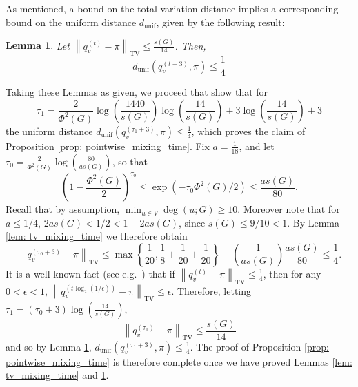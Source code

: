 \documentclass[11pt,twoside]{article}
\newtheorem{lemma}{Lemma}
\newcommand{\set}[1]{\left\{#1\right\}}
\newcommand{\norm}[1]{\left\lVert#1\right\rVert}
\newcommand{\1}{\mathbf{1}}
\begin{document}
As mentioned, a bound on the total variation distance implies a corresponding bound on the uniform distance $d_{\mathrm{unif}}$, given by the following result:
\begin{lemma}
	\label{lem: tv_to_uniform_distance}
	Let $\norm{q_v^{(t)} - \pi}_{\mathrm{TV}} \leq \frac{s(G)}{14}$. Then,
	\begin{equation*}
	d_{\mathrm{unif}}(q_v^{(t + 3)},\pi) \leq \frac{1}{4}
	\end{equation*}
\end{lemma}

\noindent Taking these Lemmas as given, we proceed that show that for
\begin{equation*}
\tau_1 = \frac{2}{\Phi^2(G)} \log \left(\frac{1440}{s(G)}\right)\log \left(\frac{14}{s(G)}\right)  + 3 \log \left(\frac{14}{s(G)}\right) + 3
\end{equation*}
the uniform distance $d_{\textrm{unif}}(q_v^{(\tau_1 + 3)}, \pi) \leq \frac{1}{4}$, which proves the claim of Proposition \ref{prop: pointwise_mixing_time}. Fix $a = \frac{1}{18}$, and let $\tau_0 = \frac{2}{\Phi^2(G)} \log \left(\frac{80}{a s(G)}\right)$, so that
\begin{equation*}
\left(1 - \frac{\Phi^2(G)}{2}\right)^{\tau_0} \leq \exp(- \tau_0\Phi^2(G)/2) \leq \frac{as(G)}{80}.
\end{equation*}
Recall that by assumption, $\min_{u \in V} \deg(u;G) \geq 10$. Moreover note that for $a \leq 1/4$, $2as(G) < 1/2 < 1 - 2as(G)$, since $s(G) \leq 9/10 < 1$. By Lemma \ref{lem: tv_mixing_time} we therefore obtain
\begin{equation*}
\norm{q_v^{(\tau_0 + 3)} - \pi}_{\mathrm{TV}} \leq \max \set{\frac{1}{20}, \frac{1}{8} + \frac{1}{20} + \frac{1}{20}} + \left(\frac{1}{as(G)}\right) \frac{as(G)}{80} \leq \frac{1}{4}.
\end{equation*}
It is a well known fact (see e.g.~\cite{montenegro2002}) that if $\norm{q_v^{(t)} - \pi}_{\mathrm{TV}} \leq \frac{1}{4}$, then for any $0 < \epsilon < 1$, $\norm{q_v^{(t\log_2(1/\epsilon))} - \pi}_{\mathrm{TV}} \leq \epsilon$. Therefore, letting $\tau_1 = (\tau_0 + 3) \log(\frac{14}{s(G)})$, 
\begin{equation*}
\norm{q_v^{(\tau_1)} - \pi}_{\mathrm{TV}} \leq \frac{s(G)}{14}
\end{equation*}
and so by Lemma \ref{lem: tv_to_uniform_distance}, $d_{\textrm{unif}}(q_v^{(\tau_1 + 3)}, \pi) \leq \frac{1}{4}$. The proof of Proposition \ref{prop: pointwise_mixing_time} is therefore complete once we have proved Lemmas \ref{lem: tv_mixing_time} and \ref{lem: tv_to_uniform_distance}.
\end{document}
